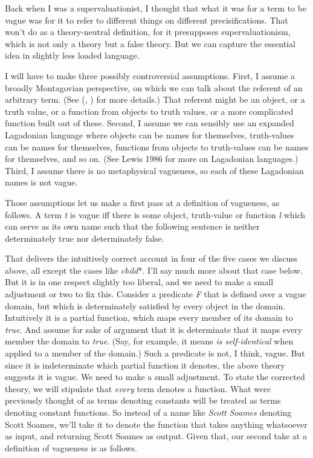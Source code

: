 \documentclass[
  10pt,
  letterpaper,
  DIV=11,
  numbers=noendperiod,
  twoside]{scrartcl}
\begin{document}
Back when I was a supervaluationist, I thought that what it was for a
term to be vague was for it to refer to different things on different
precisifications. That won't do as a theory-neutral definition, for it
presupposes supervaluationism, which is not only a theory but a false
theory. But we can capture the essential idea in slightly less loaded
language.

I will have to make three possibly controversial assumptions. First, I
assume a broadly Montagovian perspective, on which we can talk about the
referent of an arbitrary term. (See
(,
) for more details.) That referent
might be an object, or a truth value, or a function from objects to
truth values, or a more complicated function built out of these. Second,
I assume we can sensibly use an expanded Lagadonian language where
objects can be names for themselves, truth-values can be names for
themselves, functions from objects to truth-values can be names for
themselves, and so on. (See Lewis 1986 for more on Lagadonian
languages.) Third, I assume there is no metaphysical vagueness, so each
of these Lagadonian names is not vague.

Those assumptions let us make a first pass at a definition of vagueness,
as follows. A term \emph{t} is vague iff there is some object,
truth-value or function \emph{l} which can serve as its own name such
that the following sentence is neither determinately true nor
determinately false.

That delivers the intuitively correct account in four of the five cases
we discuss above, all except the cases like \emph{child}*. I'll say much
more about that case below. But it is in one respect slightly too
liberal, and we need to make a small adjustment or two to fix this.
Consider a predicate \emph{F} that is defined over a vague domain, but
which is determinately satisfied by every object in the domain.
Intuitively it is a partial function, which maps every member of its
domain to \emph{true}. And assume for sake of argument that it is
determinate that it maps every member the domain to \emph{true}. (Say,
for example, it means \emph{is self-identical} when applied to a member
of the domain.) Such a predicate is not, I think, vague. But since it is
indeterminate which partial function it denotes, the above theory
suggests it is vague. We need to make a small adjustment. To state the
corrected theory, we will stipulate that \emph{every} term denotes a
function. What were previously thought of as terms denoting constants
will be treated as terms denoting constant functions. So instead of a
name like \emph{Scott Soames} denoting Scott Soames, we'll take it to
denote the function that takes anything whatsoever as input, and
returning Scott Soames as output. Given that, our second take at a
definition of vagueness is as follows.
\end{document}
